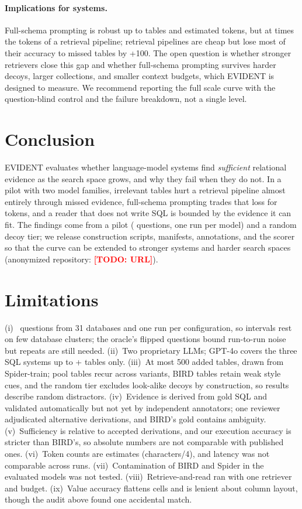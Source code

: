\documentclass[11pt]{article}
\newif\ifdraft \drafttrue   %
\newcommand{\todo}[1]{\ifdraft\textcolor{red}{\textbf{[TODO: #1]}}\fi}
\newcommand{\benchmark}{\mbox{EVIDENT}}  %
\begin{document}
\paragraph{Implications for systems.} Full-schema prompting is robust up to \nCandTopMax{} tables and \fsTokTop{} estimated tokens, but at \tokRatioTop{} times the tokens of a retrieval pipeline; retrieval pipelines are cheap but lose most of their accuracy to missed tables by +100. The open question is whether stronger retrievers close this gap and whether full-schema prompting survives harder decoys, larger collections, and smaller context budgets, which \benchmark{} is designed to measure. We recommend reporting the full scale curve with the question-blind control and the failure breakdown, not a single level.

\section{Conclusion}\label{sec:conclusion}
\benchmark{} evaluates whether language-model systems find \emph{sufficient} relational evidence as the search space grows, and why they fail when they do not. In a pilot with two model families, irrelevant tables hurt a retrieval pipeline almost entirely through missed evidence, full-schema prompting trades that loss for tokens, and a reader that does not write SQL is bounded by the evidence it can fit. The findings come from a pilot (\nQuestions{} questions, one run per model) and a random decoy tier; we release construction scripts, manifests, annotations, and the scorer so that the curve can be extended to stronger systems and harder search spaces (anonymized repository: \todo{URL}).

\section*{Limitations}
(i)~\nQuestions{} questions from 31 databases and one run per configuration, so intervals rest on few database clusters; the oracle's \orFlips{} flipped questions bound run-to-run noise but repeats are still needed. (ii)~Two proprietary LLMs; GPT-4o covers the three SQL systems up to +\gpCommonTop{} tables only. (iii)~At most 500 added tables, drawn from Spider-train; pool tables recur across variants, BIRD tables retain weak style cues, and the random tier excludes look-alike decoys by construction, so results describe random distractors. (iv)~Evidence is derived from gold SQL and validated automatically but not yet by independent annotators; one reviewer adjudicated alternative derivations, and BIRD's gold contains ambiguity. (v)~Sufficiency is relative to accepted derivations, and our execution accuracy is stricter than BIRD's, so absolute numbers are not comparable with published ones. (vi)~Token counts are estimates (characters/4), and latency was not comparable across runs. (vii)~Contamination of BIRD and Spider in the evaluated models was not tested. (viii)~Retrieve-and-read ran with one retriever and budget. (ix)~Value accuracy flattens cells and is lenient about column layout, though the audit above found one accidental match.
\end{document}
